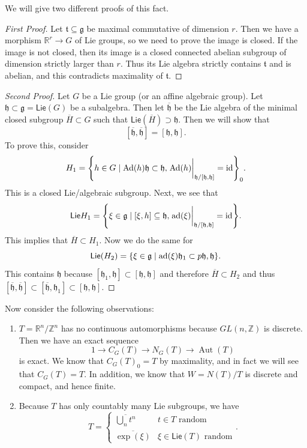 \documentclass[leqno, openany]{memoir}
\theoremstyle{definition}
\theoremstyle{remark}
\theoremstyle{plain}
\theoremstyle{definition}
\theoremstyle{remark}
\newcommand{\R}{\mathbb{R}}
\newcommand{\Z}{\mathbb{Z}}
\newcommand{\mf}[1]{\mathfrak{#1}}
\newcommand{\mr}[1]{\mathrm{#1}}
\newcommand{\ms}[1]{\mathsf{#1}}
\newcommand{\ol}[1]{\overline{#1}}
\DeclareMathOperator{\ad}{ad}
\DeclareMathOperator{\Ad}{Ad}
\DeclareMathOperator{\Aut}{Aut}
\begin{document}
We will give two different proofs of this fact.

\begin{proof}[First Proof]
    Let $\mf{t} \subseteq \mf{g}$ be maximal commutative of dimension $r$. Then we have a morphism $\R^r \to G$ of Lie groups, so we need to prove the image is closed. If the image is not closed, then its image is a closed connected abelian subgroup of dimension strictly larger than $r$. Thus its Lie algebra strictly contains $\mf{t}$ and is abelian, and this contradicts maximality of $\mf{t}$.
\end{proof}

\begin{proof}[Second Proof]
    Let $G$ be a Lie group (or an affine algebraic group). Let $\mf{h} \subset \mf{g} = \ms{Lie}(G)$ be a subalgebra. Then let $\ol{\mf{h}}$ be the Lie algebra of the minimal closed subgroup $\ol{H} \subset G$ such that $\ms{Lie}(\ol{H}) \supset \mf{h}$. Then we will show that
    \[ [\ol{\mf{h}}, \ol{\mf{h}}] = [\mf{h}, \mf{h}]. \]
    To prove this, consider 
    \[ H_1 = \qty{ h \in G \mid \Ad(h) \mf{h} \subset \mf{h}, \eval{\Ad(h)}_{\mf{h}/[\mf{h}, \mf{h}]} = \mr{id} }_0. \]
    This is a closed Lie/algebraic subgroup. Next, we see that 
    \[ \ms{Lie} H_1 = \qty{\xi \in \mf{g} \mid [\xi, h] \subseteq \mf{h}, \eval{\ad(\xi)}_{\mf{h} / [\mf{h}, \mf{h}]} = \mr{id} }. \]
    This implies that $\ol{H} \subset H_1$. Now we do the same for 
    \[ \ms{Lie} (H_2) = \qty{\xi \in \mf{g} \mid \ad(\xi) \mf{h}_1 \subset p\mf{h, \mf{h}}}. \]
    This contains $\mf{h}$ because $[\mf{h}_1, \mf{h}] \subset [\mf{h}, \mf{h}]$ and therefore $\ol{H} \subset H_2$ and thus $[\ol{\mf{h}}, \ol{\mf{h}}] \subset [\ol{\mf{h}}, \mf{h}_1] \subset [\mf{h}, \mf{h}]$.
\end{proof}

Now consider the following observations:
\begin{enumerate}
    \item $T = \R^n / \Z^n$ has no continuous automorphisms because $GL(n, \Z)$ is discrete. Then we have an exact sequence
        \[ 1 \to C_G(T) \to N_G(T) \to \Aut(T) \]
        is exact. We know that $C_G(T)_0 = T$ by maximality, and in fact we will see that $C_G(T) = T$. In addition, we know that $W = N(T)/T$ is discrete and compact, and hence finite.
    \item Because $T$ has only countably many Lie subgroups, we have
        \[ T = \begin{cases}
            \ol{\bigcup_n t^n} & t \in T \text{ random} \\
            \ol{\exp (\xi)} & \xi \in \ms{Lie}(T) \text{ random}
        \end{cases}. \]
\end{enumerate}
\end{document}
